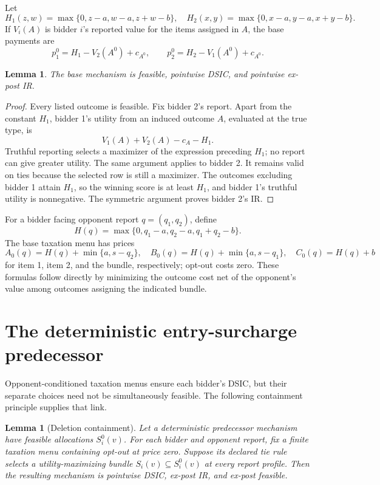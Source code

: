 \documentclass[11pt]{article}
\newtheorem{lemma}[theorem]{Lemma}
\begin{document}
Let
\[
H_1(z,w)=\max\{0,z-a,w-a,z+w-b\},
\quad
H_2(x,y)=\max\{0,x-a,y-a,x+y-b\}.
\]
If \(V_i(A)\) is bidder \(i\)'s reported value for the items assigned in
\(A\), the base payments are
\[
p_1^0=H_1-V_2(A^0)+c_{A^0},\qquad
p_2^0=H_2-V_1(A^0)+c_{A^0}.
\]

\begin{lemma}\label{lem:base}
The base mechanism is feasible, pointwise DSIC, and pointwise ex-post IR.
\end{lemma}

\begin{proof}
Every listed outcome is feasible.  Fix bidder 2's report.  Apart from the
constant \(H_1\), bidder 1's utility from an induced outcome \(A\), evaluated
at the true type, is
\[
V_1(A)+V_2(A)-c_A-H_1.
\]
Truthful reporting selects a maximizer of the expression preceding \(H_1\);
no report can give greater utility.  The same argument applies to bidder 2.
It remains valid on ties because the selected row is still a maximizer.
The outcomes excluding bidder 1 attain \(H_1\), so the winning score is at
least \(H_1\), and bidder 1's truthful utility is nonnegative.  The symmetric
argument proves bidder 2's IR.
\end{proof}

For a bidder facing opponent report \(q=(q_1,q_2)\), define
\[
H(q)=\max\{0,q_1-a,q_2-a,q_1+q_2-b\}.
\]
The base taxation menu has prices
\begin{equation}\label{eq:base-menu}
A_0(q)=H(q)+\min\{a,s-q_2\},\quad
B_0(q)=H(q)+\min\{a,s-q_1\},\quad
C_0(q)=H(q)+b
\end{equation}
for item 1, item 2, and the bundle, respectively; opt-out costs zero.
These formulas follow directly by minimizing the outcome cost net of the
opponent's value among outcomes assigning the indicated bundle.

\section{The deterministic entry-surcharge predecessor}\label{sec:surcharge}

Opponent-conditioned taxation menus ensure each bidder's DSIC, but their
separate choices need not be simultaneously feasible.  The following
containment principle supplies that link.

\begin{lemma}[Deletion containment]\label{lem:containment}
Let a deterministic predecessor mechanism have feasible allocations
\(S_i^0(v)\).  For each bidder and opponent report, fix a finite taxation
menu containing opt-out at price zero.  Suppose its declared tie rule selects
a utility-maximizing bundle \(S_i(v)\subseteq S_i^0(v)\) at every report
profile.  Then the resulting mechanism is pointwise DSIC, ex-post IR, and
ex-post feasible.
\end{lemma}
\end{document}
